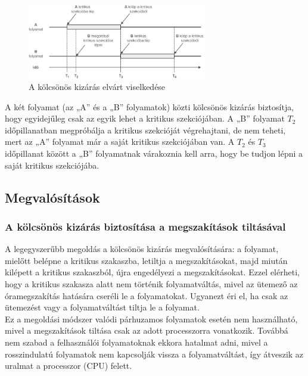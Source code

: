 \documentclass[tikz,12pt,margin=0px]{article}
\begin{document}
	\begin{figure}[H]
		\centering
		\includegraphics[width=0.7\textwidth]{img/mutex.png}
		\caption{A kölcsönös kizárás elvárt viselkedése}
	\end{figure}

    \noindent A két folyamat (az „A” és a „B” folyamatok) közti kölcsönös kizárás biztosítja, hogy egyidejűleg csak az egyik lehet a kritikus szekciójában. A „B” folyamat $T_2$ időpillanatban megpróbálja a kritikus szekcióját végrehajtani, de nem teheti, mert az „A” folyamat már a saját kritikus szekciójában van. A $T_2$ és  $T_3$ időpillanat között a „B” folyamatnak várakoznia kell arra, hogy be tudjon lépni a saját kritikus szekciójába.

	\subsection*{Megvalósítások}
	
    \subsubsection*{A kölcsönös kizárás biztosítása a megszakítások tiltásával}

    A legegyszerűbb megoldás a kölcsönös kizárás megvalósítására: a folyamat, mielőtt belépne a kritikus szakaszba, letiltja a megszakításokat, majd miután kilépett a kritikus szakaszból, újra engedélyezi a megszakításokat. Ezzel elérheti, hogy a kritikus szakasza alatt nem történik folyamatváltás, mivel az ütemező az óramegszakítás hatására cseréli le a folyamatokat. Ugyanezt éri el, ha csak az ütemezést vagy a folyamatváltást tiltja le a folyamat.\\

    \noindent Ez a megoldási módszer valódi párhuzamos folyamatok esetén nem használható, mivel a megszakítások tiltása csak az adott processzorra vonatkozik. Továbbá nem szabad a felhasználói folyamatoknak ekkora hatalmat adni, mivel a rosszindulatú folyamatok nem kapcsolják vissza a folyamatváltást, így átveszik az uralmat a processzor (CPU) felett.\\
\end{document}
